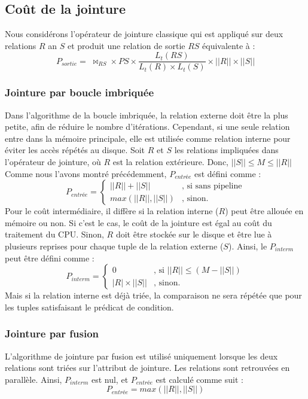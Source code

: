 \subsection{Coût de la jointure}
Nous considérons l'opérateur de jointure classique qui est appliqué sur deux relations $R$ an $S$ et produit une relation de sortie $RS$ équivalente à :
\begin{equation}
P_{sortie} = \; \bowtie_{RS} \times PS \times \frac{L_t(RS)}{L_t(R) \times L_t(S)} \times || R || \times || S ||
\end{equation}

\subsubsection{Jointure par boucle imbriquée}
Dans l'algorithme de la boucle imbriquée, la relation externe doit être la plus petite, afin de réduire le nombre d'itérations. Cependant, si une seule relation entre dans la mémoire principale, elle est utilisée comme relation interne pour éviter les accès répétés au disque.
Soit $R$ et $S$ les relations impliquées dans l'opérateur de jointure, où $R$ est la relation extérieure. Donc, $|| S || \leqslant M \leqslant || R ||$ Comme nous l'avons montré précédemment, $P_{entrée}$ est défini comme :
\begin{equation}
 P_{entrée} = \begin{cases}
			||R|| + ||S|| & \text{, si sans pipeline} \\
			max(||R||, ||S||)  & \text{, sinon.}
\end{cases}
\end{equation}
Pour le coût intermédiaire, il diffère si la relation interne ($R$) peut être allouée en mémoire ou non. Si c'est le cas, le coût de la jointure est égal au coût du traitement du CPU. Sinon, $R$ doit être stockée sur le disque et être lue à plusieurs reprises pour chaque tuple de la relation externe ($S$). Ainsi, le $P_{interm}$ peut être défini comme :
\begin{equation}
 P_{interm} = \begin{cases}
			0 & \text{, si } || R || \leqslant (M - || S||) \\
			|R| \times ||S||  & \text{, sinon.}
\end{cases}
\end{equation}
Mais si la relation interne est déjà triée, la comparaison ne sera répétée que pour les tuples satisfaisant le prédicat de condition.

\subsubsection{Jointure par fusion}
L'algorithme de jointure par fusion est utilisé uniquement lorsque les deux relations sont triées sur l'attribut de jointure. Les relations sont retrouvées en parallèle. Ainsi, $P_{interm}$ est nul, et $P_{entrée}$ est calculé comme suit :
\begin{equation}
P_{entrée} = max (|| R ||, || S ||)
\end{equation} 

